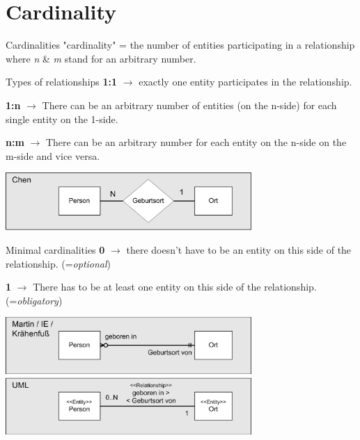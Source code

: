 \section{Cardinality}
\begin{frame}[allowframebreaks]{Cardinalities}
    "cardinality" =  the number of entities participating in a relationship where  \textit{n} \& \textit{m} stand for an arbitrary number.

\begin{block}{Types of relationships}
 \textbf{1:1} $\to$ exactly one entity participates in the relationship. %
 
 \textbf{1:n} $\to$ There can be an arbitrary number of entities (on the n-side) for each single entity on the 1-side. %
 
 \textbf{n:m} $\to$ There can be an arbitrary number for each entity on the n-side on the m-side and vice versa. %
\end{block}

\begin{center}
  \includegraphics[width=0.7\textwidth]{img/ERD_Darstellungen_Chen.png}
\end{center}

\framebreak
\begin{block}{Minimal cardinalities} 
\textbf{0} $\to$ there doesn't have to be an entity on this side of the relationship. (=\textit{optional})

\textbf{1} $\to$ There has to be at least one entity on this side of the relationship.  (=\textit{obligatory})
\end{block}

\begin{center}
    \includegraphics[width=0.7\textwidth]{img/ERD_Darstellungen_Crowfoot.png}
    \includegraphics[width=0.7\textwidth]{img/ERD_Darstellungen_UML.png}
\end{center}

\end{frame}



